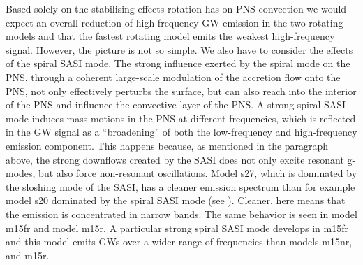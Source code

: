 Based solely on the stabilising effects rotation has on PNS convection we would expect an overall 
reduction of high-frequency GW emission in the two rotating models and that the fastest rotating model
emits the weakest high-frequency signal. However, the picture is not
so simple. 
We also have to consider the effects of the spiral SASI mode.
The strong influence exerted by the spiral mode on the PNS, through a coherent large-scale
modulation of the accretion flow onto the PNS, not only effectively perturbs the surface, 
but can also reach into the interior of the PNS and influence the convective layer of the PNS.
A strong spiral SASI mode induces mass motions in the PNS at different frequencies, which is 
reflected in the GW signal as a ``broadening'' of both the low-frequency and high-frequency
emission component. This happens because, as mentioned in the paragraph above, the strong downflows 
created by the SASI does not only excite resonant g-modes, but also force non-resonant oscillations. 
Model s27, which is dominated by the sloshing mode of the SASI,
has a cleaner emission spectrum than for example model s20 dominated by the spiral SASI mode (see ). 
Cleaner, here means that the emission is concentrated in narrow bands. The same behavior is seen in model m15fr and
model m15r. A particular strong spiral SASI mode develops in m15fr and this model emits GWs over a
wider range of frequencies than models m15nr, and m15r. 
